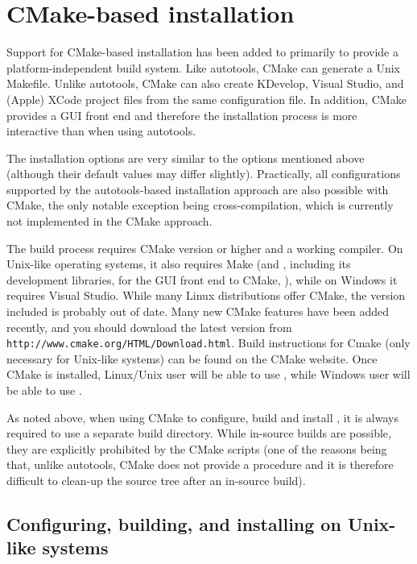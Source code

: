 \section{CMake-based installation}\label{s:cmake_inst}

Support for CMake-based installation has been added to {\sundials} primarily
to provide a platform-independent build system. Like autotools, CMake can generate a 
Unix Makefile. Unlike autotools, CMake can also create KDevelop, Visual Studio, and 
(Apple) XCode project files from the same configuration file.
In addition, CMake provides a GUI front end and therefore the installation process 
is more interactive than when using autotools.

The installation options are very similar to the options mentioned above (although 
their default values may differ slightly).
Practically, all configurations supported by the autotools-based installation approach
are also possible with CMake, the only notable exception being cross-compilation, which 
is currently not implemented in the CMake approach.

The {\sundials} build process requires CMake version  or
higher and a working compiler.  On Unix-like operating systems, it
also requires Make (and , including its development libraries,
for the GUI front end to CMake, ), while on Windows it
requires Visual Studio.  While many Linux distributions offer CMake,
the version included is probably out of date.  Many new CMake
features have been added recently, and you should download the latest
version from {\tt http://www.cmake.org/HTML/Download.html}.  Build
instructions for Cmake (only necessary for Unix-like systems) can be
found on the CMake website.  Once CMake is installed, Linux/Unix user
will be able to use , while Windows user will be able to
use .

As noted above, when using CMake to configure, build and install {\sundials}, it is always
required to use a separate build directory. While in-source builds are possible, they are
explicitly prohibited by the {\sundials} CMake scripts (one of the reasons being that, unlike
autotools, CMake does not provide a  procedure and it is therefore
difficult to clean-up the source tree after an in-source build).

\subsection{Configuring, building, and installing on Unix-like systems}

